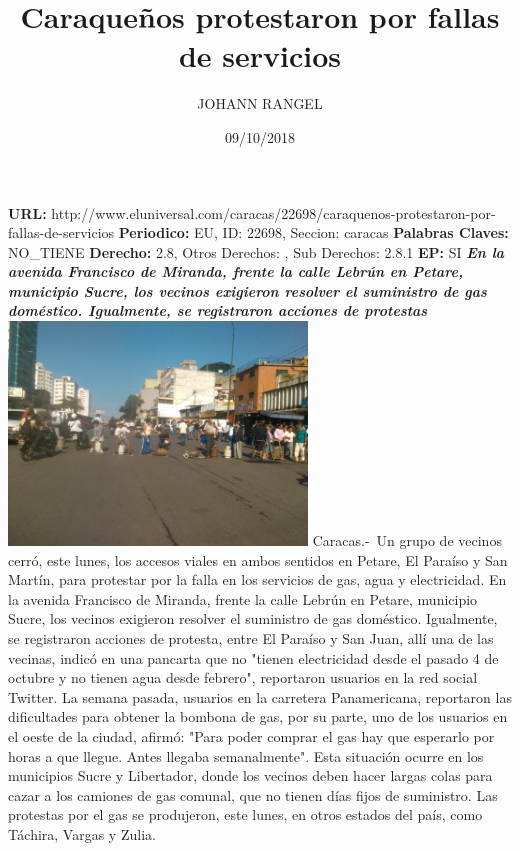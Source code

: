 \documentclass{article}%
\title{\textbf{Caraqueños protestaron por fallas de servicios}}%
\author{JOHANN RANGEL}%
\date{09/10/2018}%
\begin{document}
%
\normalsize%
\maketitle%
\textbf{URL: }%
http://www.eluniversal.com/caracas/22698/caraquenos{-}protestaron{-}por{-}fallas{-}de{-}servicios\newline%
%
\textbf{Periodico: }%
EU, %
ID: %
22698, %
Seccion: %
caracas\newline%
%
\textbf{Palabras Claves: }%
NO\_TIENE\newline%
%
\textbf{Derecho: }%
2.8, %
Otros Derechos: %
, %
Sub Derechos: %
2.8.1\newline%
%
\textbf{EP: }%
SI\newline%
\newline%
%
\textbf{\textit{En la avenida Francisco de Miranda, frente la calle Lebrún en Petare, municipio Sucre, los vecinos exigieron resolver el suministro de gas doméstico. Igualmente, se registraron acciones de protestas}}%
\newline%
\newline%
%
\includegraphics[width=300px]{235.jpg}%
\newline%
%
Caracas.{-}~Un grupo de vecinos  cerró, este lunes, los accesos viales en ambos sentidos en Petare, El Paraíso y San Martín,  para protestar por la falla en  los servicios de gas,  agua y electricidad.%
\newline%
%
En la avenida  Francisco de Miranda, frente la calle Lebrún en Petare, municipio Sucre, los vecinos exigieron resolver el suministro de gas doméstico. \newline%
Igualmente, se registraron acciones de protesta, entre El Paraíso y San Juan, allí una de las vecinas, indicó en una pancarta que no "tienen electricidad desde el pasado 4 de octubre y no tienen agua desde febrero", reportaron usuarios en la red social Twitter.%
\newline%
%
La semana pasada, usuarios en la carretera  Panamericana, reportaron las dificultades para obtener la bombona de gas, por su parte, uno de los usuarios en el oeste de la ciudad, afirmó: "Para poder comprar el gas hay que esperarlo por horas a que llegue. Antes llegaba semanalmente". \newline%
Esta situación  ocurre en los municipios Sucre y Libertador, donde los vecinos deben hacer largas colas para cazar a los camiones de gas comunal, que no tienen días fijos de suministro.%
\newline%
%
Las protestas por el gas se produjeron, este lunes, en otros estados del país, como Táchira, Vargas y Zulia.%
\newline%
%
\end{document}
